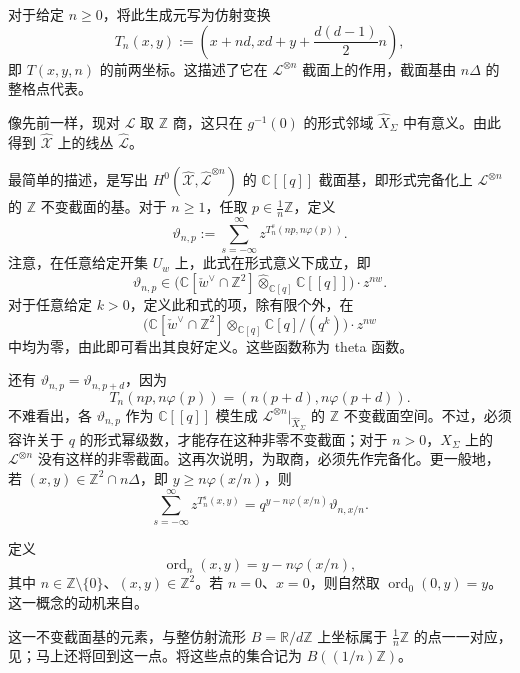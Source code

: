 对于给定 $n\geq0$，将此生成元写为仿射变换
\[
T_n(x,y):=\left(x+nd,xd+y+\frac{d(d-1)}2n\right),
\]
即 $T(x,y,n)$ 的前两坐标。这描述了它在 $\mathcal L^{\otimes n}$ 截面上的作用，截面基由 $n\Delta$ 的整格点代表。

像先前一样，现对 $\mathcal L$ 取 $\mathbb Z$ 商，这只在 $g^{-1}(0)$ 的形式邻域 $\widehat X_\Sigma$ 中有意义。由此得到 $\widehat{\mathcal X}$ 上的线丛 $\widehat{\mathcal L}$。

最简单的描述，是写出 $H^0(\widehat{\mathcal X},\widehat{\mathcal L}^{\otimes n})$ 的 $\mathbb C[[q]]$ 截面基，即形式完备化上 $\mathcal L^{\otimes n}$ 的 $\mathbb Z$ 不变截面的基。对于 $n\geq1$，任取 $p\in\tfrac1n\mathbb Z$，定义
\[
\vartheta_{n,p}:=\sum_{s=-\infty}^\infty
z^{T_n^s(np,n\varphi(p))}.
\]
注意，在任意给定开集 $U_w$ 上，此式在形式意义下成立，即
\[
\vartheta_{n,p}\in
\bigl(\mathbb C[\check w^\vee\cap\mathbb Z^2]
\widehat\otimes_{\mathbb C[q]}\mathbb C[[q]]\bigr)\cdot z^{nw}.
\]
对于任意给定 $k>0$，定义此和式的项，除有限个外，在
\[
\bigl(\mathbb C[\check w^\vee\cap\mathbb Z^2]
\otimes_{\mathbb C[q]}\mathbb C[q]/(q^k)\bigr)\cdot z^{nw}
\]
中均为零，由此即可看出其良好定义。这些函数称为 theta 函数。

还有 $\vartheta_{n,p}=\vartheta_{n,p+d}$，因为
\[
T_n(np,n\varphi(p))=(n(p+d),n\varphi(p+d)).
\]
不难看出，各 $\vartheta_{n,p}$ 作为 $\mathbb C[[q]]$ 模生成 $\mathcal L^{\otimes n}|_{\widehat X_\Sigma}$ 的 $\mathbb Z$ 不变截面空间。不过，必须容许关于 $q$ 的形式幂级数，才能存在这种非零不变截面；对于 $n>0$，$X_\Sigma$ 上的 $\mathcal L^{\otimes n}$ 没有这样的非零截面。这再次说明，为取商，必须先作完备化。更一般地，若 $(x,y)\in\mathbb Z^2\cap n\Delta$，即 $y\geq n\varphi(x/n)$，则
\begin{equation}\label{eq:8.13}
\sum_{s=-\infty}^\infty z^{T_n^s(x,y)}
=q^{y-n\varphi(x/n)}\vartheta_{n,x/n}.
\end{equation}

定义
\begin{equation}\label{eq:8.14}
\operatorname{ord}_n(x,y)=y-n\varphi(x/n),
\end{equation}
其中 $n\in\mathbb Z\setminus\{0\}$、$(x,y)\in\mathbb Z^2$。若 $n=0$、$x=0$，则自然取 $\operatorname{ord}_0(0,y)=y$。这一概念的动机来自。

这一不变截面基的元素，与整仿射流形 $B=\mathbb R/d\mathbb Z$ 上坐标属于 $\tfrac1n\mathbb Z$ 的点一一对应，见；马上还将回到这一点。将这些点的集合记为 $B((1/n)\mathbb Z)$。

